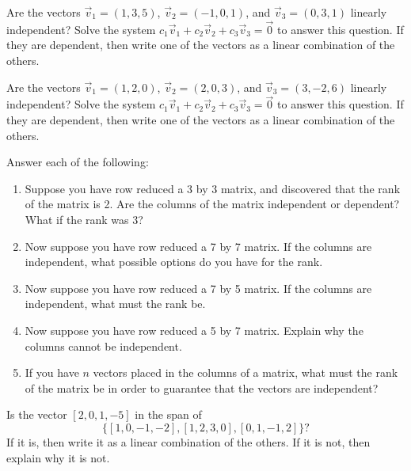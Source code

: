 \begin{problem}
 Are the vectors $\vec v_1 = (1,3,5)$, $ \vec v_2=(-1,0,1)$, and $\vec v_3=(0,3,1)$ linearly independent?  Solve the system $c_1\vec v_1+c_2\vec v_2+c_3\vec v_3=\vec 0$ to answer this question. If they are dependent, then write one of the vectors as a linear combination of the others.
\end{problem}


\begin{problem}
 Are the vectors $\vec v_1 = (1,2,0)$, $ \vec v_2=(2,0,3)$, and $\vec v_3=(3,-2,6)$ linearly independent?  Solve the system $c_1\vec v_1+c_2\vec v_2+c_3\vec v_3=\vec 0$ to answer this question.  If they are dependent, then write one of the vectors as a linear combination of the others. 
\end{problem}

 

\begin{problem}
Answer each of the following:
\begin{enumerate}
 \item  Suppose you have row reduced a 3 by 3 matrix, and discovered that the rank of the matrix is 2.  Are the columns of the matrix independent or dependent?  What if the rank was 3?  

 \item Now suppose you have row reduced a 7 by 7 matrix. If the columns are independent, what possible options do you have for the rank.

 \item Now suppose you have row reduced a 7 by 5 matrix. If the columns are independent, what must the rank be.

 \item Now suppose you have row reduced a 5 by 7 matrix. Explain why the columns cannot be independent. 

 \item If you have $n$ vectors placed in the columns of a matrix, what must the rank of the matrix be in order to guarantee that the vectors are independent?

\end{enumerate}

\end{problem}


\begin{problem}
 Is the vector $[2, 0, 1, -5]$ in the span of $$\{[1, 0, -1, -2], [1, 2, 3, 0], [0, 1, -1, 2]\}?$$ If it is, then write it as a linear combination of the others.  If it is not, then explain why it is not.
\end{problem}







